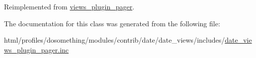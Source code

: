 Reimplemented from \hyperlink{classviews__plugin__pager_a693a102e85a9b63bc59057a4efca0d12}{views\_\-plugin\_\-pager}.

The documentation for this class was generated from the following file:\begin{DoxyCompactItemize}
\item 
html/profiles/dosomething/modules/contrib/date/date\_\-views/includes/\hyperlink{date__views__plugin__pager_8inc}{date\_\-views\_\-plugin\_\-pager.inc}\end{DoxyCompactItemize}
